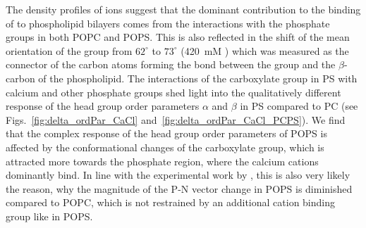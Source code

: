 \documentclass[journal=jpcbfk,manuscript=article]{achemso}
\begin{document}
The density profiles of ions suggest that
the dominant contribution to the binding of  to phospholipid bilayers
comes from the interactions with the phosphate groups in both POPC and POPS. 
This is also reflected in the shift of the mean orientation 
of the  group from $62^\circ$ to $73^\circ$ (420~mM )
which was measured as the connector of the carbon atoms 
forming the bond between the group and the $\beta$-carbon of the phospholipid. 
The interactions of the carboxylate group in PS with calcium and other phosphate groups
shed light into the qualitatively different response of the head group order parameters $\alpha$ and $\beta$ in PS compared to PC 
(see Figs.~\ref{fig:delta_ordPar_CaCl} and~\ref{fig:delta_ordPar_CaCl_PCPS}). 
We find that the complex response of the head group order parameters of POPS 
is affected by the conformational changes of the carboxylate group,
which is attracted more towards the phosphate region, 
where the calcium cations dominantly bind. 
In line with the experimental work by \citet{browning80},
this is also very likely the reason, 
why the magnitude of the P-N vector change in POPS is diminished compared to POPC, 
which is not restrained by an additional cation binding group like  in POPS. 
\end{document}
